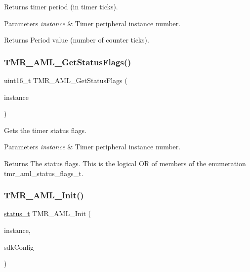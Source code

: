 Returns timer period (in timer ticks). 


\begin{DoxyParams}{Parameters}
{\em instance} & Timer peripheral instance number.\\
\hline
\end{DoxyParams}
\begin{DoxyReturn}{Returns}
Period value (number of counter ticks). 
\end{DoxyReturn}
\mbox{\label{group__function__group_gab13a1129d27008d231d4f14ac6b756c6}} 
\subsubsection{\texorpdfstring{TMR\_AML\_GetStatusFlags()}{TMR\_AML\_GetStatusFlags()}}
{\footnotesize\ttfamily uint16\+\_\+t T\+M\+R\+\_\+\+A\+M\+L\+\_\+\+Get\+Status\+Flags (\begin{DoxyParamCaption}\item[{\mbox{\hyperlink{common__aml_8h_a562bd37c7d07adcedec5993bc0cd96e5}{aml\+\_\+instance\+\_\+t}}}]{instance }\end{DoxyParamCaption})}



Gets the timer status flags. 


\begin{DoxyParams}{Parameters}
{\em instance} & Timer peripheral instance number.\\
\hline
\end{DoxyParams}
\begin{DoxyReturn}{Returns}
The status flags. This is the logical OR of members of the enumeration tmr\+\_\+aml\+\_\+status\+\_\+flags\+\_\+t. 
\end{DoxyReturn}
\mbox{\label{group__function__group_gacd35322aa62b00c8389236ab1c28de3b}} 
\subsubsection{\texorpdfstring{TMR\_AML\_Init()}{TMR\_AML\_Init()}}
{\footnotesize\ttfamily \mbox{\hyperlink{group__ksdk__common_gaaabdaf7ee58ca7269bd4bf24efcde092}{status\+\_\+t}} T\+M\+R\+\_\+\+A\+M\+L\+\_\+\+Init (\begin{DoxyParamCaption}\item[{\mbox{\hyperlink{common__aml_8h_a562bd37c7d07adcedec5993bc0cd96e5}{aml\+\_\+instance\+\_\+t}}}]{instance,  }\item[{const \mbox{\hyperlink{structtmr__sdk__config__t}{tmr\+\_\+sdk\+\_\+config\+\_\+t}} $\ast$}]{sdk\+Config }\end{DoxyParamCaption})}



